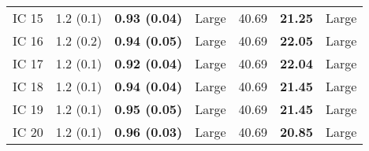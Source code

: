 \begin{tabular}{lllllll}
 IC 15 &         1.2 (0.1) &  \textbf{0.93 (0.04)} &       Large &                   40.69 &           \textbf{21.25} &       Large \\
 IC 16 &         1.2 (0.2) &  \textbf{0.94 (0.05)} &       Large &                   40.69 &           \textbf{22.05} &       Large \\
 IC 17 &         1.2 (0.1) &  \textbf{0.92 (0.04)} &       Large &                   40.69 &           \textbf{22.04} &       Large \\
 IC 18 &         1.2 (0.1) &  \textbf{0.94 (0.04)} &       Large &                   40.69 &           \textbf{21.45} &       Large \\
 IC 19 &         1.2 (0.1) &  \textbf{0.95 (0.05)} &       Large &                   40.69 &           \textbf{21.45} &       Large \\
 IC 20 &         1.2 (0.1) &  \textbf{0.96 (0.03)} &       Large &                   40.69 &           \textbf{20.85} &       Large \\
\bottomrule
\end{tabular}

